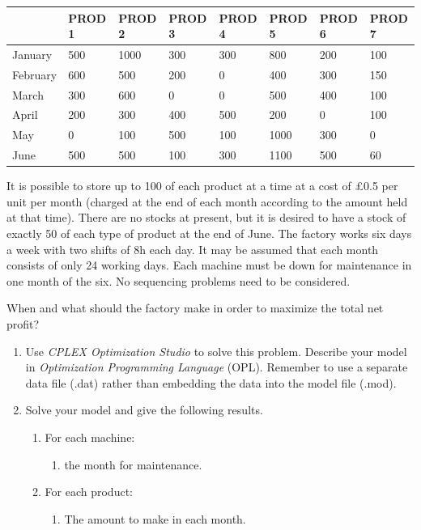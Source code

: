 \documentclass[12pt,a4paper]{article}
\theoremstyle{definition}
\begin{document}
\begin{enumerate}
    \begin{table}[htbp]
      \scriptsize
      \centering
      \renewcommand\arraystretch{1.1}
      \begin{tabular}{m{} m{}<{\centering} m{}<{\centering} m{}<{\centering} m{}<{\centering} m{}<{\centering} m{}<{\centering} m{}<{\centering}}
      \hline
       & \textbf{PROD 1} & \textbf{PROD 2} & \textbf{PROD 3} & \textbf{PROD 4} & \textbf{PROD 5} & \textbf{PROD 6} &  \textbf{PROD 7} \\\hline
      January & 500 & 1000 & 300 & 300 & 800 & 200 & 100 \\
      February & 600 & 500 & 200 & 0 & 400 & 300 & 150 \\
      March & 300 & 600 & 0 & 0 & 500 & 400 & 100 \\
      April & 200 & 300 & 400 & 500 & 200 & 0 & 100 \\
      May & 0 & 100 & 500 & 100 & 1000 & 300 & 0 \\
      June & 500 & 500 & 100 & 300 & 1100 & 500 & 60 \\
      \hline
      \end{tabular}
    \end{table}

    It is possible to store up to 100 of each product at a time at a cost of \pounds0.5 per unit per month (charged at the end of each month according to the amount held at that time). There are no stocks at present, but it is desired to have a stock of exactly 50 of each type of product at the end of June. The factory works six days a week with two shifts of 8h each day. It may be assumed that each month consists of only 24 working days. Each machine must be down for maintenance in one month of the six. No sequencing problems need to be considered.

    When and what should the factory make in order to maximize the total net profit?

    \begin{enumerate}
    \item
    Use \emph{CPLEX Optimization Studio} to solve this problem. Describe your model in \emph{Optimization Programming Language} (OPL). Remember to use a separate data file (.dat) rather than embedding the data into the model file (.mod).

    \item
    Solve your model and give the following results.
    \begin{enumerate}
    \item
    For each machine:
    \begin{enumerate}
    \item
    the month for maintenance.
    \end{enumerate}
    \item
    For each product:
    \begin{enumerate}
    \item
    The amount to make in each month.
    

\end{enumerate}
\end{enumerate}
\end{enumerate}
\end{enumerate}
\end{document}
